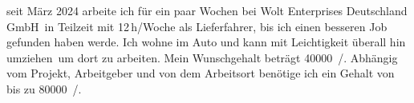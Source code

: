 		seit März 2024 arbeite ich für ein paar Wochen bei \glqq Wolt Enterprises Deutschland GmbH\grqq\ in Teilzeit mit 12\,h/Woche als Lieferfahrer, bis ich einen besseren Job gefunden haben werde.
		Ich wohne im Auto und kann mit Leichtigkeit überall hin \glqq umziehen\grqq\, um dort zu arbeiten.
		Mein Wunschgehalt beträgt \SI{40000}{\sieuro/\year}.
		Abhängig vom Projekt, Arbeitgeber und von dem Arbeitsort benötige ich ein Gehalt von bis zu \SI{80000}{\sieuro/\year}.